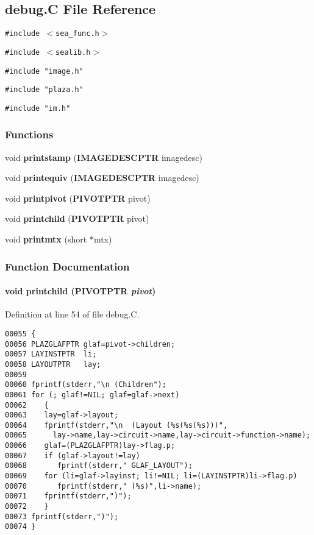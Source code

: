\subsection{debug.C File Reference}
\label{debug.C}
{\tt \#include $<$sea\_\-func.h$>$}\par
{\tt \#include $<$sealib.h$>$}\par
{\tt \#include "image.h"}\par
{\tt \#include "plaza.h"}\par
{\tt \#include "im.h"}\par
\subsubsection*{Functions}
\begin{CompactItemize}
\item 
void {\bf printstamp} ({\bf IMAGEDESCPTR} imagedesc)
\item 
void {\bf printequiv} ({\bf IMAGEDESCPTR} imagedesc)
\item 
void {\bf printpivot} ({\bf PIVOTPTR} pivot)
\item 
void {\bf printchild} ({\bf PIVOTPTR} pivot)
\item 
void {\bf printmtx} (short $\ast$mtx)
\end{CompactItemize}


\subsubsection{Function Documentation}
\label{debug.C_a3}
\paragraph{\setlength{\rightskip}{0pt plus 5cm}void printchild ({\bf PIVOTPTR} {\em pivot})}\hfill



Definition at line 54 of file debug.C.\small\begin{verbatim}00055 {
00056 PLAZGLAFPTR glaf=pivot->children;
00057 LAYINSTPTR  li;
00058 LAYOUTPTR   lay;
00059 
00060 fprintf(stderr,"\n (Children");
00061 for (; glaf!=NIL; glaf=glaf->next)
00062    {
00063    lay=glaf->layout;
00064    fprintf(stderr,"\n  (Layout (%s(%s(%s)))",
00065      lay->name,lay->circuit->name,lay->circuit->function->name);
00066    glaf=(PLAZGLAFPTR)lay->flag.p;
00067    if (glaf->layout!=lay)
00068       fprintf(stderr," GLAF_LAYOUT");
00069    for (li=glaf->layinst; li!=NIL; li=(LAYINSTPTR)li->flag.p)
00070       fprintf(stderr," (%s)",li->name);
00071    fprintf(stderr,")");
00072    }
00073 fprintf(stderr,")");
00074 }
\end{verbatim}\normalsize 
\label{debug.C_a1}
